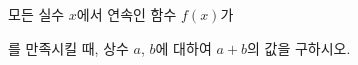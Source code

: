 모든 실수 $x$에서 연속인 함수 $f(x)$가 \par\smallskip{}\par\smallskip\noindent 를 만족시킬 때, 상수 $a$, $b$에 대하여 $a+b$의 값을 구하시오.
